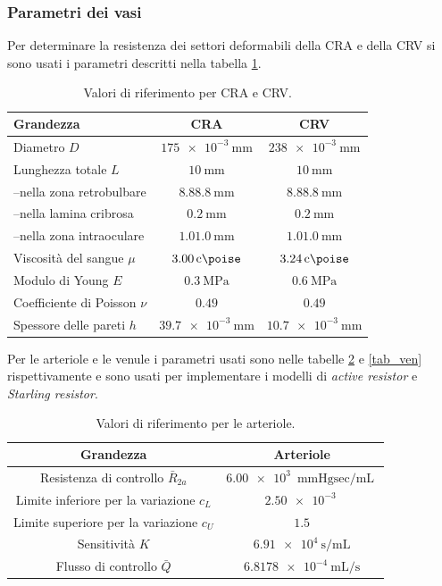 \documentclass{article}
\begin{document}
\subsubsection*{Parametri dei vasi}
Per determinare la resistenza dei settori deformabili della CRA e della CRV si sono usati i parametri descritti nella tabella \ref{tab_CR}.
\begin{table}[h!]
\begin{center}
\begin{tabular}{| l | c | c |}
\hline
\textbf{Grandezza} & \textbf{CRA} & \textbf{CRV}\\
\hline
Diametro $D$& $\SI{175e-3}{\milli \meter}$ &  $\SI{238e-3}{\milli \meter}$\\
Lunghezza totale $L$ & $\SI{10}{\milli \meter}$ &  $\SI{10}{\milli \meter}$\\
--nella zona retrobulbare & $8.8 \SI{8.8}{\milli \meter}$ & $8.8 \SI{8.8}{\milli \meter}$\\
--nella lamina cribrosa  & $\SI{0.2}{\milli \meter}$ & $\SI{0.2}{\milli \meter}$\\
--nella zona intraoculare  & $1.0\SI{1.0}{\milli \meter}$ & $1.0\SI{1.0}{\milli \meter}$\\
Viscosità del sangue $\mu$ & $\SI{3.00}{\centi \poise}$ & $\SI{3.24}{\centi \poise}$\\
Modulo di Young $E$ & $\SI{0.3}{\mega\pascal}$ & $\SI{0.6}{\mega\pascal}$\\
Coefficiente di Poisson $\nu$ & $0.49$ & $0.49$\\
Spessore delle pareti $h$ & $\SI{39.7e-3}{\milli\meter}$ & $\SI{10.7e-3}{\milli\meter}$\\
\hline
\end{tabular}
\caption{Valori di riferimento per CRA e CRV.}
\label{tab_CR}
\end{center}
\end{table}

Per le arteriole e le venule i parametri usati sono nelle tabelle \ref{tab_art} e \ref{tab_ven} rispettivamente e sono usati per implementare i modelli di \textit{active resistor} e \textit{Starling resistor}.

\begin{table}[h!]
\begin{center}
\begin{tabular}{| c | c |}
\hline
\textbf{Grandezza} & \textbf{Arteriole}\\
\hline
Resistenza di controllo $\bar{R}_{2a}$ & $ \SI{6.00e3}{\mmHg \sec \per \milli \liter}$ \\
Limite inferiore per la variazione $c_L$ & $\SI{2.50e-3}{}$\\
Limite superiore per la variazione $c_U$ & $1.5$\\
Sensitività $K$ & $\SI{6.91e4}{\second \per \milli \liter}$\\
Flusso di controllo $\bar{Q}$ & $\SI{6.8178e-4}{\milli \liter \per \second}$\\
\hline
\end{tabular}
\caption{Valori di riferimento per le arteriole.}
\label{tab_art}
\end{center}
\end{table}
\end{document}
